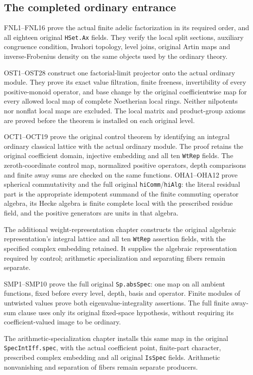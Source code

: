 \subsection{The completed ordinary entrance}

FNL1--FNL16 prove the actual finite adelic factorization in its required
order, and all eighteen original \texttt{HSet.\allowbreak Ax} fields. They verify the
local split sections, auxiliary congruence condition, Iwahori topology,
level joins, original Artin maps and inverse-Frobenius density on the
same objects used by the ordinary theory.

OST1--OST28 construct one factorial-limit projector onto the actual
ordinary module. They prove its exact value filtration, finite freeness,
invertibility of every positive-monoid operator, and base change by the
original coefficientwise map for every allowed local map of complete
Noetherian local rings. Neither nilpotents nor nonflat local maps are
excluded. The local matrix and product-group axioms are proved before
the theorem is installed on each original level.

OCT1--OCT19 prove the original control theorem by identifying an integral
ordinary classical lattice with the actual ordinary module. The proof
retains the original coefficient domain, injective embedding and all ten
\texttt{Wt\allowbreak Rep} fields. The zeroth-coordinate control map, normalized
positive operators, depth comparisons and finite away sums are checked
on the same functions. OHA1--OHA12 prove spherical commutativity and the
full original \texttt{hi\allowbreak Comm}/\texttt{hi\allowbreak Alg}: the literal residual part
is the appropriate idempotent summand of the finite commuting operator
algebra, its Hecke algebra is finite complete local with the prescribed
residue field, and the positive generators are units in that algebra.

The additional weight-representation chapter constructs the original algebraic representation's integral lattice and all ten \texttt{Wt\allowbreak Rep} assertion fields, with the specified complex embedding retained. It supplies the algebraic representation required by control; arithmetic specialization and separating fibers remain separate.\par SMP1--SMP10 prove the full original \texttt{Sp.\allowbreak abs\allowbreak Spec}: one map on all ambient functions, fixed before every level, depth, basis and operator. Finite modules of untwisted values prove both eigenvalue-integrality assertions. The full finite away-sum clause uses only its original fixed-space hypothesis, without requiring its coefficient-valued image to be ordinary.\par The arithmetic-specialization chapter installs this same map in the original \texttt{Spec\allowbreak Int\allowbreak Iff.\allowbreak spec}, with the actual coefficient point, finite-part character, prescribed complex embedding and all original \texttt{Is\allowbreak Spec} fields. Arithmetic nonvanishing and separation of fibers remain separate producers.

